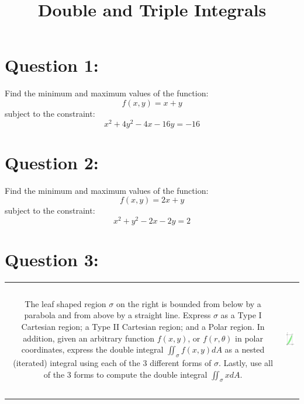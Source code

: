 \documentclass{article}
\title{Double and Triple Integrals}
\date{}
\begin{document}
\maketitle



\section*{Question 1:}

Find the minimum and maximum values of the function:
\[f(x,y) = x + y\]
subject to the constraint:
\[x^2 + 4y^2 - 4x - 16y = -16\] 



\section*{Question 2:}

Find the minimum and maximum values of the function:
\[f(x,y) = 2x + y\]
subject to the constraint:
\[x^2 + y^2 - 2x - 2y = 2\]



\section*{Question 3:}

\begin{tabular}{cc}
\parbox{0.6\textwidth}{The leaf shaped region \(\sigma\) on the right is bounded from below by a parabola and from above by a straight line. Express \(\sigma\) as a Type I Cartesian region; a Type II Cartesian region; and a Polar region. In addition, given an arbitrary function \(f(x,y)\), or \(f(r,\theta)\) in polar coordinates, express the double integral \(\iint_{\sigma} f(x,y)dA\) as a nested (iterated) integral using each of the 3 different forms of \(\sigma\). Lastly, use all of the 3 forms to compute the double integral \(\iint_{\sigma} x dA\).}
& 
\parbox{0.4\textwidth}{\includegraphics[height = 5cm]{Test_bench_part_3_images/Test_bench_part_3_image_5}}
\end{tabular}
\end{document}
